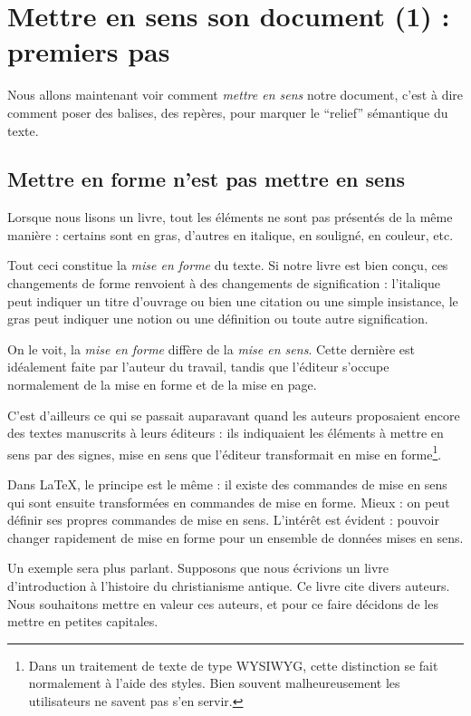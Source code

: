\chapter{Mettre en sens son document (1) : premiers pas}

\begin{intro}
Nous allons maintenant voir comment \emph{mettre en sens} notre document, c'est à dire comment poser des balises, des repères, pour marquer le \enquote{relief} sémantique du texte.
\end{intro}

\section{Mettre en forme n'est pas mettre en sens}\label{sensforme}

Lorsque nous lisons un livre, tout les éléments ne sont pas présentés de la même manière : certains sont en gras, d'autres en italique, en souligné, en couleur, etc. 

Tout ceci constitue la \emph{mise en forme} du texte. Si notre livre est bien conçu, ces changements de forme renvoient à des changements de signification : l'italique peut indiquer un titre d'ouvrage ou bien une citation ou une simple insistance, le gras peut indiquer une notion ou une définition ou toute autre signification.

On le voit, la \emph{mise en forme} diffère de la \emph{mise en sens}. Cette dernière est idéalement faite par l'auteur du travail, tandis que l'éditeur s'occupe normalement de la mise en forme et de la mise en page.

C'est d'ailleurs ce qui se passait auparavant quand les auteurs proposaient encore des textes manuscrits à leurs éditeurs : ils indiquaient les éléments à mettre en sens par des signes, mise en sens que l'éditeur transformait en mise en forme\footnote{Dans un traitement de texte de type WYSIWYG, cette distinction se fait normalement à l'aide des styles. Bien souvent malheureusement les utilisateurs ne savent pas s'en servir.}.

Dans \LaTeX, le principe est le même : il existe des commandes de mise en sens qui sont ensuite transformées en commandes de mise en forme. Mieux : on peut définir ses propres commandes de mise en sens. L'intérêt est  évident : pouvoir changer rapidement de mise en forme pour un ensemble de données mises en sens.

Un exemple sera plus parlant. Supposons que nous écrivions un livre d'introduction à l'histoire du christianisme antique. Ce livre cite divers auteurs. Nous souhaitons mettre en valeur ces auteurs, et pour ce faire décidons de les mettre en petites capitales.


